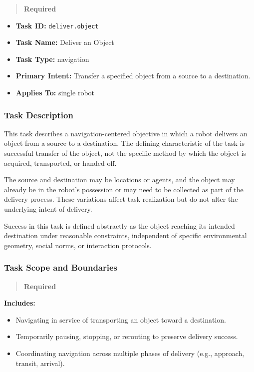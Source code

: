\documentclass[utf8]{frontiers_suppmat} %
\providecommand{\tightlist}{%
  \setlength{\itemsep}{0pt}\setlength{\parskip}{0pt}}
\begin{document}
\begin{quote}
\textbf{Required}
\end{quote}

\begin{itemize}
\tightlist
\item
  \textbf{Task ID:} \texttt{deliver.object}
\item
  \textbf{Task Name:} Deliver an Object
\item
  \textbf{Task Type:} navigation
\item
  \textbf{Primary Intent:} Transfer a specified object from a source to
  a destination.
\item
  \textbf{Applies To:} single robot
\end{itemize}

\subsubsection{Task Description}\label{task-description}

This task describes a navigation-centered objective in which a robot
delivers an object from a source to a destination. The defining
characteristic of the task is successful transfer of the object, not the
specific method by which the object is acquired, transported, or handed
off.

The source and destination may be locations or agents, and the object
may already be in the robot's possession or may need to be collected as
part of the delivery process. These variations affect task realization
but do not alter the underlying intent of delivery.

Success in this task is defined abstractly as the object reaching its
intended destination under reasonable constraints, independent of
specific environmental geometry, social norms, or interaction protocols.

\subsubsection{Task Scope and
Boundaries}\label{task-scope-and-boundaries}

\begin{quote}
\textbf{Required}
\end{quote}

\textbf{Includes:}

\begin{itemize}
\tightlist
\item
  Navigating in service of transporting an object toward a destination.
\item
  Temporarily pausing, stopping, or rerouting to preserve delivery
  success.
\item
  Coordinating navigation across multiple phases of delivery (e.g.,
  approach, transit, arrival).
\end{itemize}
\end{document}
